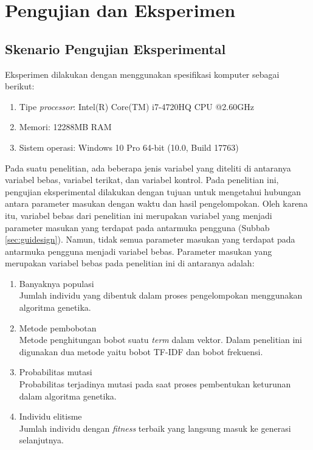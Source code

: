 \chapter{Pengujian dan Eksperimen}
\label{chap:testing}

\section{Skenario Pengujian Eksperimental}
\label{sec:exp-scenario}
Eksperimen dilakukan dengan menggunakan spesifikasi komputer sebagai berikut:

\begin{enumerate}
	\item Tipe \textit{processor}: Intel(R) Core(TM) i7-4720HQ CPU @2.60GHz
	\item Memori: 12288MB RAM
	\item Sistem operasi: Windows 10 Pro 64-bit (10.0, Build 17763)
\end{enumerate}

Pada suatu penelitian, ada beberapa jenis variabel yang diteliti di antaranya variabel bebas, variabel terikat, dan variabel kontrol. Pada penelitian ini, pengujian eksperimental dilakukan dengan tujuan untuk mengetahui hubungan antara parameter masukan dengan waktu dan hasil pengelompokan. Oleh karena itu, variabel bebas dari penelitian ini merupakan variabel yang menjadi parameter masukan yang terdapat pada antarmuka pengguna (Subbab \ref{sec:guidesign}). Namun, tidak semua parameter masukan yang terdapat pada antarmuka pengguna menjadi variabel bebas. Parameter masukan yang merupakan variabel bebas pada penelitian ini di antaranya adalah:

\begin{enumerate}
	\item Banyaknya populasi \\
	Jumlah individu yang dibentuk dalam proses pengelompokan menggunakan algoritma genetika.
	\item Metode pembobotan \\
	Metode penghitungan bobot suatu \textit{term} dalam vektor. Dalam penelitian ini digunakan dua metode yaitu bobot TF-IDF dan bobot frekuensi.
	\item Probabilitas mutasi \\
	Probabilitas terjadinya mutasi pada saat proses pembentukan keturunan dalam algoritma genetika.
	\item Individu elitisme \\
	Jumlah individu dengan \textit{fitness} terbaik yang langsung masuk ke generasi selanjutnya.
\end{enumerate}

